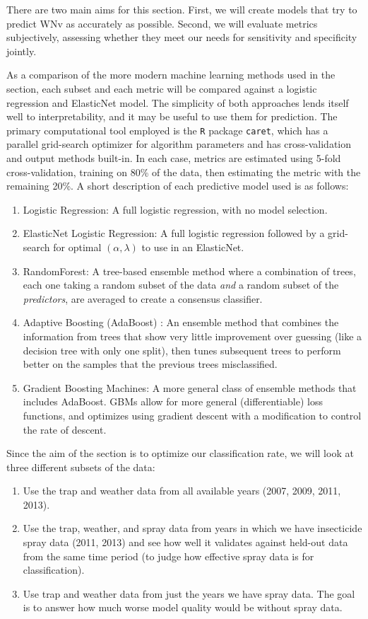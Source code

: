 \documentclass[12pt]{article}
\begin{document}
There are two main aims for this section. First, we will create models that try to predict WNv as accurately as possible. Second, we will evaluate metrics subjectively, assessing whether they meet our needs for sensitivity and specificity jointly. 

As a comparison of the more modern machine learning methods used in the section, each subset and each metric will be compared against a logistic regression and ElasticNet model. The simplicity of both approaches lends itself well to interpretability, and it may be useful to use them for prediction. The primary computational tool employed is the \verb+R+ package \verb+caret+, which has a parallel grid-search optimizer for algorithm parameters and has cross-validation and output methods built-in. In each case, metrics are estimated using 5-fold cross-validation, training on 80\% of the data, then estimating the metric with the remaining 20\%. 
A short description of each predictive model used is as follows:
\begin{enumerate}
\item Logistic Regression: A full logistic regression, with no model selection.
\item ElasticNet Logistic Regression: A full logistic regression followed by a grid-search for optimal $(\alpha, \lambda)$ to use in an ElasticNet.
\item RandomForest\cite{breiman2001random}: A tree-based ensemble method where a combination of trees, each one taking a random subset of the data \emph{and} a random subset of the \emph{predictors}, are averaged to create a consensus classifier.
\item Adaptive Boosting (AdaBoost) \cite{Schapire99improvedboosting}: An ensemble method that combines the information from trees that show very little improvement over guessing (like a decision tree with only one split), then tunes subsequent trees to perform better on the samples that the previous trees misclassified.
\item Gradient Boosting Machines\cite{friedman2001greedy}: A more general class of ensemble methods that includes AdaBoost. GBMs allow for more general (differentiable) loss functions, and optimizes using gradient descent with a modification to control the rate of descent.
\end{enumerate}

Since the aim of the section is to optimize our classification rate, we will look at three different subsets of the data:
\begin{enumerate}
\item Use the trap and weather data from all available years (2007, 2009, 2011, 2013).
\item Use the trap, weather, and spray data from years in which we have insecticide spray data (2011, 2013) and see how well it validates against held-out data from the same time period (to judge how effective spray data is for classification).
\item Use trap and weather data from just the years we have spray data. The goal is to answer how much worse model quality would be without spray data.
\end{enumerate}
\end{document}
